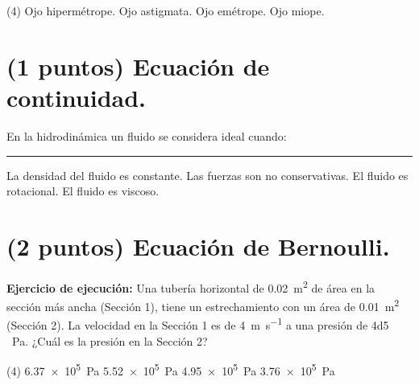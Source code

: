 \documentclass[12pt]{exam}
\begin{document}
\begin{questions}
\begin{figure}[H]
    \end{figure}
    \begin{tasks}(4)
        \task Ojo hipermétrope.
        \task Ojo astigmata.
        \task Ojo emétrope.
        \task Ojo miope.
    \end{tasks}

    \section{(1 puntos) Ecuación de continuidad.}

    \question En la hidrodinámica un fluido se considera ideal cuando: \rule{2cm}{0.1mm}
    \begin{tasks}
        \task La densidad del fluido es constante.
        \task Las fuerzas son no conservativas.
        \task El fluido es rotacional.
        \task El fluido es viscoso.
    \end{tasks}

    \newpage

    \section{(2 puntos) Ecuación de Bernoulli.}

    \question \label{Ejercicio_09} \textbf{Ejercicio de ejecución:} Una tubería horizontal de \SI{0.02}{\square\meter} de área en la sección más ancha (Sección 1), tiene un estrechamiento con un área de \SI{0.01}{\square\meter} (Sección 2). La velocidad en la Sección 1 es de \SI{4}{\meter\per\second} a una presión de \SI{4d5 }{\pascal}. ¿Cuál es la presión en la Sección 2?
    \begin{tasks}(4)
        \task \SI{6.37e5}{\pascal}
        \task \SI{5.52e5}{\pascal}
        \task \SI{4.95e5}{\pascal}
        \task \SI{3.76e5}{\pascal}
    \end{tasks}


\end{questions}
\end{document}
